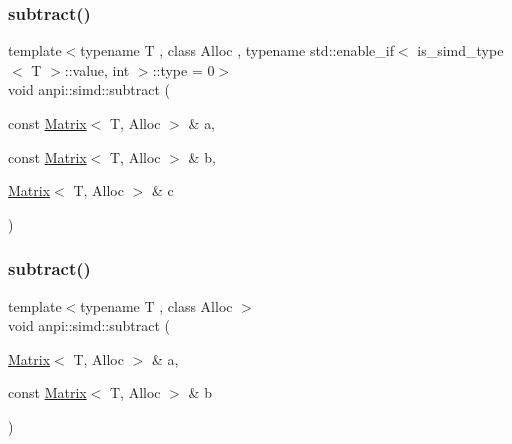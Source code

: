 \subsubsection{\texorpdfstring{subtract()}{subtract()}\hspace{0.1cm}{\footnotesize\ttfamily [1/2]}}
{\footnotesize\ttfamily template$<$typename T , class Alloc , typename std\+::enable\+\_\+if$<$ is\+\_\+simd\+\_\+type$<$ T $>$\+::value, int $>$\+::type  = 0$>$ \\
void anpi\+::simd\+::subtract (\begin{DoxyParamCaption}\item[{const \hyperlink{classanpi_1_1Matrix}{Matrix}$<$ T, Alloc $>$ \&}]{a,  }\item[{const \hyperlink{classanpi_1_1Matrix}{Matrix}$<$ T, Alloc $>$ \&}]{b,  }\item[{\hyperlink{classanpi_1_1Matrix}{Matrix}$<$ T, Alloc $>$ \&}]{c }\end{DoxyParamCaption})\hspace{0.3cm}{\ttfamily [inline]}}

\mbox{\label{namespaceanpi_1_1simd_a623f6cf02845caed74338093e0162ef9}} 
\subsubsection{\texorpdfstring{subtract()}{subtract()}\hspace{0.1cm}{\footnotesize\ttfamily [2/2]}}
{\footnotesize\ttfamily template$<$typename T , class Alloc $>$ \\
void anpi\+::simd\+::subtract (\begin{DoxyParamCaption}\item[{\hyperlink{classanpi_1_1Matrix}{Matrix}$<$ T, Alloc $>$ \&}]{a,  }\item[{const \hyperlink{classanpi_1_1Matrix}{Matrix}$<$ T, Alloc $>$ \&}]{b }\end{DoxyParamCaption})\hspace{0.3cm}{\ttfamily [inline]}}

